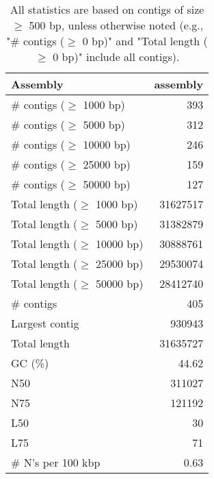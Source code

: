 \documentclass[12pt,a4paper]{article}
\begin{document}
\begin{table}[ht]
\begin{center}
\caption{All statistics are based on contigs of size $\geq$ 500 bp, unless otherwise noted (e.g., "\# contigs ($\geq$ 0 bp)" and "Total length ($\geq$ 0 bp)" include all contigs).}
\begin{tabular}{|l*{1}{|r}|}
\hline
Assembly & assembly \\ \hline
\# contigs ($\geq$ 1000 bp) & 393 \\ \hline
\# contigs ($\geq$ 5000 bp) & 312 \\ \hline
\# contigs ($\geq$ 10000 bp) & 246 \\ \hline
\# contigs ($\geq$ 25000 bp) & 159 \\ \hline
\# contigs ($\geq$ 50000 bp) & 127 \\ \hline
Total length ($\geq$ 1000 bp) & 31627517 \\ \hline
Total length ($\geq$ 5000 bp) & 31382879 \\ \hline
Total length ($\geq$ 10000 bp) & 30888761 \\ \hline
Total length ($\geq$ 25000 bp) & 29530074 \\ \hline
Total length ($\geq$ 50000 bp) & 28412740 \\ \hline
\# contigs & 405 \\ \hline
Largest contig & 930943 \\ \hline
Total length & 31635727 \\ \hline
GC (\%) & 44.62 \\ \hline
N50 & 311027 \\ \hline
N75 & 121192 \\ \hline
L50 & 30 \\ \hline
L75 & 71 \\ \hline
\# N's per 100 kbp & 0.63 \\ \hline
\end{tabular}
\end{center}
\end{table}
\end{document}
